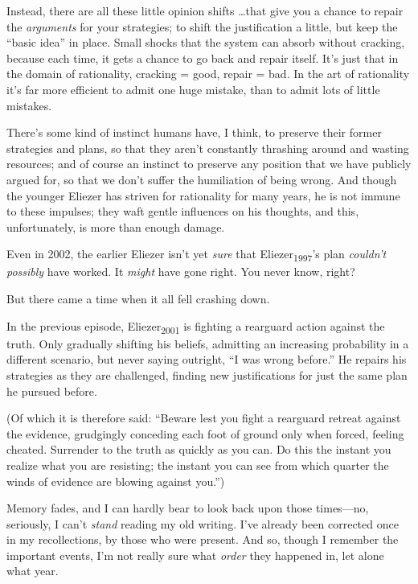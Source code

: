{
 Instead, there are all these little opinion shifts \ldots that give
you a chance to repair the \textit{arguments} for your strategies; to
shift the justification a little, but keep the ``basic
idea'' in place. Small shocks that the system can
absorb without cracking, because each time, it gets a chance to go back
and repair itself. It's just that in the domain of
rationality, cracking = good, repair = bad. In the art of rationality
it's far more efficient to admit one huge mistake, than
to admit lots of little mistakes.}

{
 There's some kind of instinct humans have, I
think, to preserve their former strategies and plans, so that they
aren't constantly thrashing around and wasting
resources; and of course an instinct to preserve any position that we
have publicly argued for, so that we don't suffer the
humiliation of being wrong. And though the younger Eliezer has striven
for rationality for many years, he is not immune to these impulses;
they waft gentle influences on his thoughts, and this, unfortunately,
is more than enough damage.}

{
 Even in 2002, the earlier Eliezer isn't yet
\textit{sure} that Eliezer\textsubscript{1997}'s plan
\textit{couldn't possibly} have worked. It
\textit{might} have gone right. You never know, right?}

{
 But there came a time when it all fell crashing down.}

\myendsectiontext


\bigskip


{
 In the previous episode, Eliezer\textsubscript{2001} is fighting a
rearguard action against the truth. Only gradually shifting his
beliefs, admitting an increasing probability in a different scenario,
but never saying outright, ``I was wrong
before.'' He repairs his strategies as they are
challenged, finding new justifications for just the same plan he
pursued before. }

{
 (Of which it is therefore said: ``Beware lest you
fight a rearguard retreat against the evidence, grudgingly conceding
each foot of ground only when forced, feeling cheated. Surrender to the
truth as quickly as you can. Do this the instant you realize what you
are resisting; the instant you can see from which quarter the winds of
evidence are blowing against you.'')}

{
 Memory fades, and I can hardly bear to look back upon those
times---no, seriously, I can't \textit{stand} reading
my old writing. I've already been corrected once in my
recollections, by those who were present. And so, though I remember the
important events, I'm not really sure what
\textit{order} they happened in, let alone what year.}

